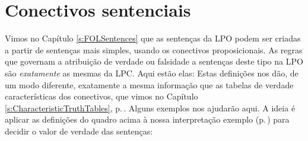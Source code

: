 \section{Conectivos sentenciais}
Vimos no Capítulo \ref{s:FOLSentences} que as sentenças da LPO podem ser criadas a partir de sentenças mais simples, usando os conectivos proposicionais. As regras que governam a atribuição de verdade ou falsidade a sentenças deste tipo na LPO são \emph{exatamente} as mesmas da LPC.
Aqui estão elas:
	\label{b:ConSent}
Estas definições nos dão, de um modo diferente, exatamente a mesma informação que as tabelas de verdade características dos conectivos, que vimos no Capítulo \ref{s:CharacteristicTruthTables}, p.\,\pageref{s:CharacteristicTruthTables}.
Alguns exemplos nos ajudarão aqui.
A ideia é aplicar as definições do quadro acima à nossa interpretação exemplo (p.\,\pageref{i:Sample}) para decidir o valor de verdade das sentenças:
